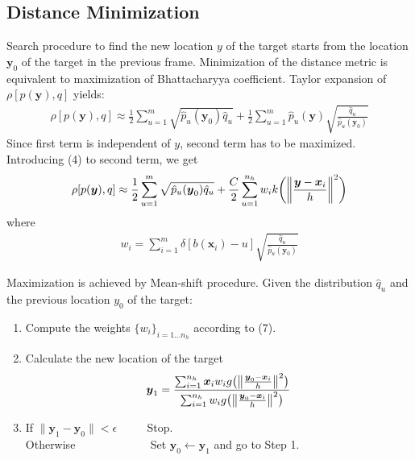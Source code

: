 \documentclass{article}
\begin{document}
\subsection*{Distance Minimization}
Search procedure to find the new location $y$ of the target starts from the location $\boldsymbol{y}_0$ of the target in the previous frame. Minimization of the distance metric is equivalent to maximization of Bhattacharyya coefficient. Taylor expansion of $\rho[p(\boldsymbol{y}),q]$ yields:
\begin{gather}
\rho[p(\boldsymbol{y}),q] \approx \frac{1}{2}\sum_{u=1}^m\sqrt{\hat{p}_{u}(\boldsymbol{y}_0)\hat{q}_{u}} + \frac{1}{2}\sum_{u=1}^m \hat{p}_{u}(\boldsymbol{y}) \sqrt{\frac{\hat{q}_{u}}{\hat{p}_{u}(\boldsymbol{y}_0)}}
\end{gather}
Since first term is independent of $y$, second term has to be maximized. Introducing (4) to second term, we get
\begin{gather}
\rho[p(\boldsymbol{y}),q] \approx \frac{1}{2}\sum_{u=1}^m\sqrt{\hat{p}_{u}(\boldsymbol{y}_0)\hat{q}_{u}} + \frac{C}{2} \sum_{u=1}^{n_h} w_i k\bigg{(}\bigg{\|}\frac{\boldsymbol{y}-\boldsymbol{x}_i}{h}\bigg{\|}^2\bigg{)}
\end{gather}
where
\begin{gather}
w_i = \sum_{i=1}^m \delta[b(\boldsymbol{x}_i)-u] \sqrt{\frac{\hat{q}_{u}}{\hat{p}_{u}(\boldsymbol{y}_0)}}
\end{gather}

Maximization is achieved by Mean-shift procedure. Given the distribution $\hat{q}_{u}$  and the previous location $y_0$ of the target: 
\begin{enumerate}
\item Compute the weights $\{w_i\}_{i=1...n_h}$ according to (7).
\item Calculate the new location of the target
\begin{gather}
\boldsymbol{y}_1 = \frac{\sum_{i=1}^{n_h} \boldsymbol{x}_i w_i g\big{(}\big{\|}\frac{\boldsymbol{y}_0-\boldsymbol{x}_i}{h}\big{\|}^2\big{)}}{\sum_{i=1}^{n_h} w_i g\big{(}\big{\|}\frac{\boldsymbol{y}_0-\boldsymbol{x}_i}{h}\big{\|}^2\big{)}}
\end{gather}
\item If $\|\boldsymbol{y}_1-\boldsymbol{y}_0\|<\epsilon$ ~~~~ Stop.\\
Otherwise ~~~~~~~~~~~~ Set $\boldsymbol{y}_0 \leftarrow \boldsymbol{y}_1$ and go to Step 1.
\end{enumerate}
\end{document}
